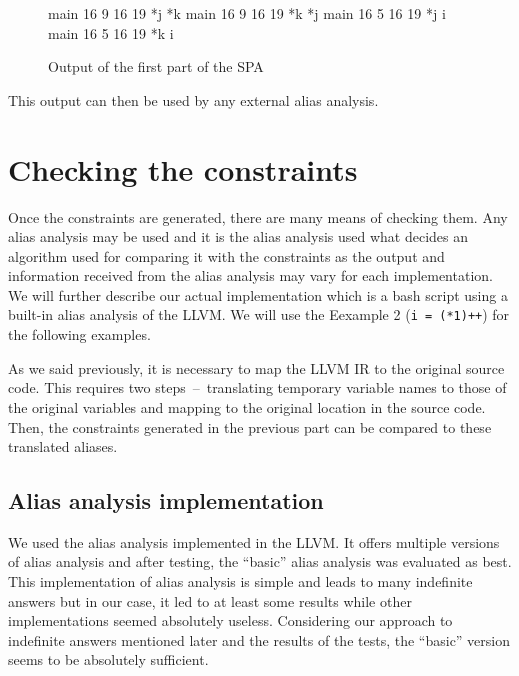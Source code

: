 \begin{figure}
\caption{Output of the first part of the SPA}
\label{first-part-output}
\begin{code}
main 16 9 16 19 *j *k
main 16 9 16 19 *k *j
main 16 5 16 19 *j i
main 16 5 16 19 *k i
\end{code}
\end{figure}

This output can then be used by any external alias analysis.

\section{Checking the constraints}
Once the constraints are generated, there are many means of checking them. Any alias analysis may be used and it is the alias analysis used what decides an algorithm used for comparing it with the constraints as the output and information received from the alias analysis may vary for each implementation. We will further describe our actual implementation which is a bash script using a built-in alias analysis of the LLVM. We will use the Eexample 2 (\verb|i = (*1)++|) for the following examples.

As we said previously, it is necessary to map the LLVM IR to the original source code. This requires two steps~--~translating temporary variable names to those of the original variables and mapping to the original location in the source code. Then, the constraints generated in the previous part can be compared to these translated aliases.

\subsection{Alias analysis implementation}
We used the alias analysis implemented in the LLVM. It offers multiple versions of alias analysis and after testing, the ``basic'' alias analysis was evaluated as best. This implementation of alias analysis is simple and leads to many indefinite answers but in our case, it led to at least some results while other implementations seemed absolutely useless. Considering our approach to indefinite answers mentioned later and the results of the tests, the ``basic'' version seems to be absolutely sufficient.

